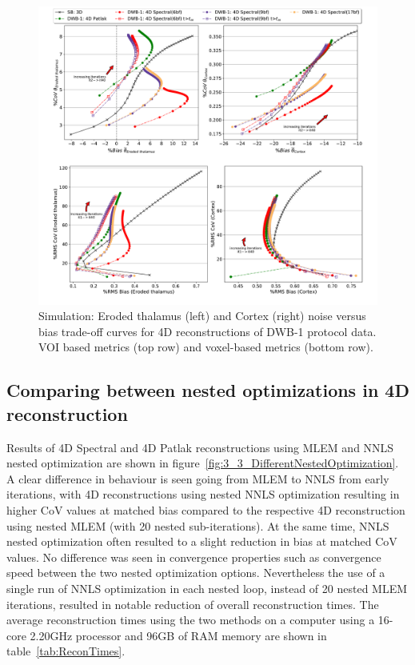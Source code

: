 \begin{figure} [ht!]
\centering
\includegraphics[scale=0.42,angle=0]{3_Results/3_2_Dynamic_Reconstruction_SimulationStudy/figures/VOI/3_2.pdf}
\caption{Simulation: Eroded thalamus (left) and Cortex (right) noise versus bias trade-off curves for 4D reconstructions of DWB-1 protocol data. 
VOI based metrics (top row) and voxel-based metrics (bottom row).}
\label{fig:3_2_DynamicModels}
\end{figure} 


\subsection{Comparing between nested optimizations in 4D reconstruction}
Results of 4D Spectral and 4D Patlak reconstructions using MLEM and NNLS nested optimization are shown in figure~\ref{fig:3_3_DifferentNestedOptimization}. A clear difference in behaviour is seen going from MLEM to NNLS from early iterations, with 4D reconstructions using nested NNLS optimization resulting in higher CoV values at matched bias compared to the respective 4D reconstruction using nested MLEM (with 20 nested sub-iterations). At the same time, NNLS nested optimization often resulted to a slight reduction in bias at matched CoV values.
No difference was seen in convergence properties such as convergence speed between the two nested optimization options. 
Nevertheless the use of a single run of NNLS optimization in each nested loop, instead of 20 nested MLEM iterations, resulted in notable reduction of overall reconstruction times. The average reconstruction times using the two methods on a computer using a 16-core 2.20GHz processor and 96GB of RAM memory are shown in table~\ref{tab:ReconTimes}.

